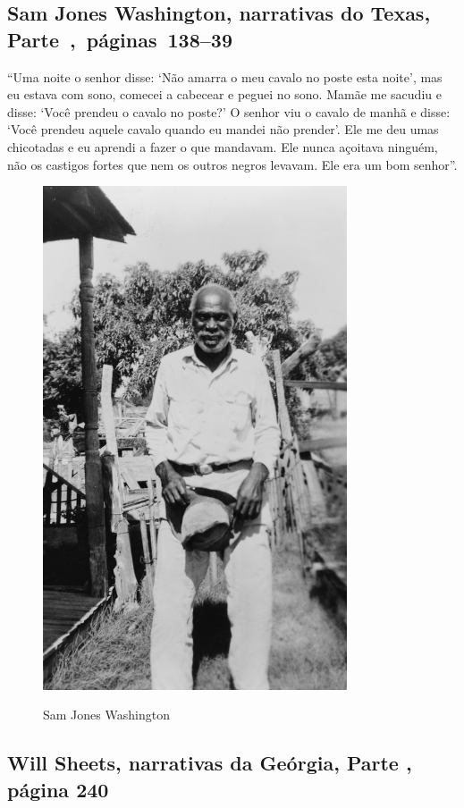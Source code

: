 \subsection{Sam Jones Washington, narrativas do Texas, Parte~,~páginas~138--39}
\label{ref280}

``Uma noite o senhor disse: `Não amarra o meu cavalo no poste esta
noite', mas eu estava com sono, comecei a cabecear e peguei no sono.
Mamãe me sacudiu e disse: `Você prendeu o cavalo no poste?' O senhor viu
o cavalo de manhã e disse: `Você prendeu aquele cavalo quando eu mandei
não prender'. Ele me deu umas chicotadas e eu aprendi a fazer o que
mandavam. Ele nunca açoitava ninguém, não os castigos fortes que nem os
outros negros levavam. Ele era um bom senhor''.

\begin{figure}[]
\centering
 \includegraphics[width=90mm]{./imgs/samjones_recorte2.jpg} \label{img8}
\caption{Sam Jones Washington}
\end{figure}

\subsection{Will Sheets, narrativas da Geórgia, Parte , página 240}
\label{ref237}

